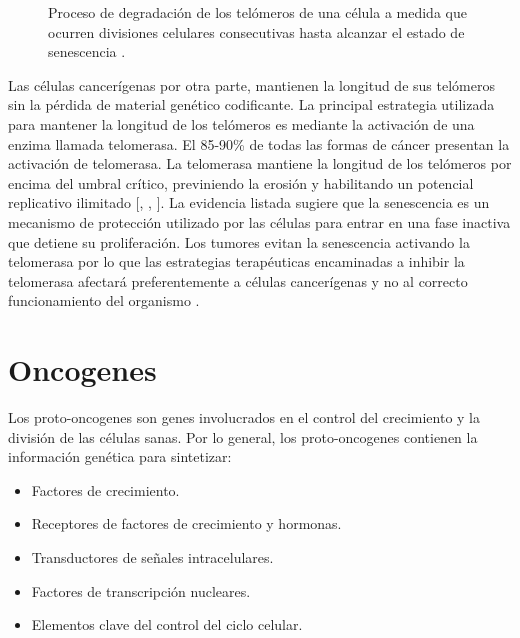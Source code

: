\begin{figure}[!ht]
\begin{center}
\end{center}\vspace*{-0.6cm}
\caption[Proceso de degradaci\'on de los tel\'omeros de una c\'elula]{Proceso de degradaci\'on de los tel\'omeros de una c\'elula a medida que ocurren divisiones celulares consecutivas hasta alcanzar el estado de senescencia \cite{viabarre2019}.}
\label{fig-telomero}
\end{figure}

\hspace{.1cm}Las células cancerígenas por otra parte, mantienen la longitud de sus telómeros sin la pérdida de material genético codificante. La principal estrategia utilizada para mantener la longitud de los telómeros es mediante la activación de una enzima llamada telomerasa. El 85-90\% de todas las formas de cáncer presentan la activación de telomerasa. La telomerasa mantiene la longitud de los telómeros por encima del umbral crítico, previniendo la erosión y habilitando un potencial replicativo ilimitado [\cite{robins}, \cite{hanahan}, \cite{cancerbook}]. La evidencia listada sugiere que la senescencia es un mecanismo de protección utilizado por las células para entrar en una fase inactiva que detiene su proliferación. Los tumores evitan la senescencia activando la telomerasa por lo que las estrategias terapéuticas encaminadas a inhibir la telomerasa afectará preferentemente a células cancerígenas y no al correcto funcionamiento del organismo \cite{viabarre2019}.

\section{Oncogenes}
\hspace{.1cm}Los proto-oncogenes son genes involucrados en el control del crecimiento y la división de las células sanas. Por lo general, los proto-oncogenes contienen la información genética para sintetizar:
\begin{itemize}
    \item Factores de crecimiento.
    \item Receptores de factores de crecimiento y hormonas.
    \item Transductores de señales intracelulares.
    \item Factores de transcripción nucleares.
    \item Elementos clave del control del ciclo celular.
\end{itemize}

